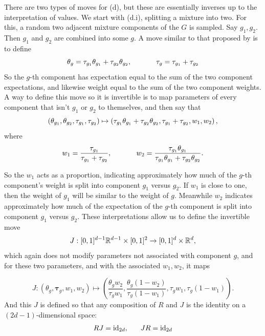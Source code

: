 \documentclass[twoside,12pt,bibstyle=chem-acs]{reedthesis}
\begin{document}
There are two types of moves for (d), but these are essentially inverses up to the interpretation of values. We start with (d.i), splitting a mixture into two. For this, a random two adjacent mixture components of the $G$ is sampled. Say $g_1, g_2$. Then $g_1$ and $g_2$ are combined into some $g$. A move similar to that proposed by \citeauthor{richardson_bayesian_1997} is to define %
\begin{equation*}
\theta_g = \mix_{g_1}\theta_{g_1} + \mix_{g_2}\theta_{g_2}, \hspace{0.1\linewidth} \mix_g = \mix_{g_1} + \mix_{g_2}
\end{equation*}
So the $g$-th component has expectation equal to the sum of the two component expectations, and likewise weight equal to the sum of the two component weights. A way to define this move so it is invertible is to map parameters of every component that isn't $g_1$ or $g_2$ to themselves, and then say that
\begin{equation*}
(\theta_{g_1}, \theta_{g_2}, \tau_{g_1}, \tau_{g_2}) \mapsto \left(\tau_{g_1}\theta_{g_1} + \tau_{g_2}\theta_{g_2}, \tau_{g_1} + \tau_{g_2}, w_1, w_2 \right),
\end{equation*}
where
\begin{equation*}
w_1 = \frac{\mix_{g_1}}{\mix_{g_1} + \mix_{g_2}}, \hspace{0.1\linewidth} w_2 = \frac{\mix_{g_1}\theta_{g_1}}{\mix_{g_1}\theta_{g_1} + \mix_{g_2} \theta_{g_2}}.
\end{equation*}

So the $w_1$ acts as a proportion, indicating approximately how much of the $g$-th component's weight is split into component $g_1$ versus $g_2$. If $w_1$ is close to one, then the weight of $g_1$ will be similar to the weight of $g$. Meanwhile $w_2$ indicates approximately how much of the expectation of the $g$-th component is split into component $g_1$ versus $g_2$. These interpretations allow us to define the invertible move
\begin{equation*}
J : [0,1]^{d-1} \mathbb{R}^{d-1} \times [0,1]^2 \to [0,1]^{d} \times \mathbb{R}^d ,
\end{equation*}
which again does not modify parameters not associated with component $g$, and for these two parameters, and with the associated $w_1, w_2$, it maps

\begin{equation*}
J:  (\theta_g, \bm\tau_g, w_1, w_2) \mapsto \left(\frac{\theta_gw_2}{\tau_gw_1}, \frac{\theta_g(1-w_2)}{\tau_g(1-w_1)}, \tau_gw_1, \tau_g(1-w_1)\right).
\end{equation*}
And this $J$ is defined so that any composition of $R$ and $J$ is the identity on a $(2d-1)$-dimensional space:
\begin{equation*}
RJ = \id_{2d}, \hspace{0.05\linewidth} JR = \id_{2d}
\end{equation*}
\end{document}
